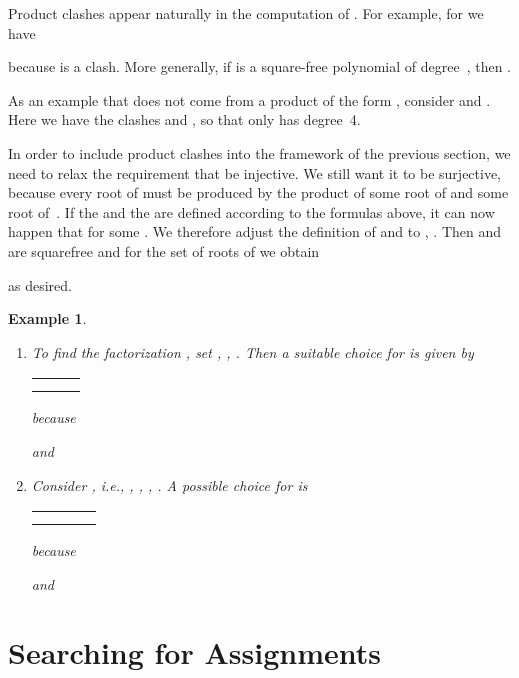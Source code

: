 \documentclass{sig-alternate}
\newtheorem{example}[theorem]{Example}
\begin{document}
Product clashes appear naturally in the computation of .
For example, for  we have

because  is a clash. More generally, if  is a square-free
polynomial of degree~, then .

As an example that does not come from a product of the form ,
consider  and . Here we have
the clashes  and ,
so that  only has degree~4.

In order to include product clashes into the framework of the previous section,
we need to relax the requirement that  be injective. We still want it to
be surjective, because every root of  must be produced by the product 
of some root  of  and some root  of~. If the  and the
 are defined according to the formulas above, it can now happen that
 for some . We therefore adjust the definition
of  and  to , .
Then  and  are squarefree and for the set of roots of 
we obtain

as desired.

\begin{example}
  \begin{enumerate}
  \item To find the factorization ,
    set , , . Then
    a suitable choice for  is
    given by
    \begin{center}
      \begin{tabular}{c|cc}
         &  &  \\\hline
         &  &  \\
         &  &  
      \end{tabular}
    \end{center}
    because
    
    and
    
  \item
    Consider , i.e.,
    , , , . A possible
    choice for  is
    \begin{center}
      \begin{tabular}{c|ccc}
         &  &  &  \\\hline
           &  &  &  \\
           &  &  & 
      \end{tabular}
    \end{center}
    because
    
    and
    
  \end{enumerate}
\end{example}

\section{Searching for Assignments}\label{sec:search}
\end{document}
